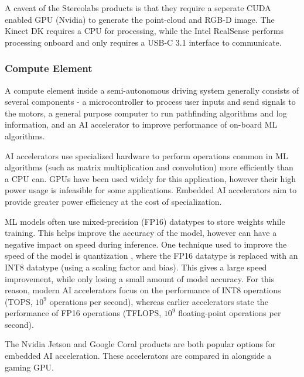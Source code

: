 \documentclass[12pt]{article}
\begin{document}
A caveat of the Stereolabs products is that they require a seperate CUDA enabled GPU (Nvidia) to generate the point-cloud
and RGB-D image. The Kinect DK requires a CPU for processing, while the Intel RealSense performs processing onboard
and only requires a USB-C 3.1 interface to communicate.

\subsubsection{Compute Element}
A compute element inside a semi-autonomous driving system generally consists of several components -
a microcontroller to process user inputs and
send signals to the motors, a general purpose computer to run pathfinding algorithms and log information,
and an AI accelerator to improve performance of on-board ML algorithms.

AI accelerators use specialized hardware to perform operations common in ML algorithms (such as matrix multiplication
and convolution) more efficiently than a CPU can. GPUs have been used widely for this application, however their high
power usage is infeasible for some applications. Embedded AI accelerators aim to provide greater power efficiency
at the cost of specialization.

ML models often use mixed-precision (FP16) datatypes to store weights while training. This helps improve the accuracy
of the model, however can have a negative impact on speed during inference. One technique used to improve the speed
of the model is quantization \cite{jacobQuantizationTrainingNeural2017}, where the FP16 datatype is replaced with an
INT8 datatype (using a scaling factor and bias). This gives a large speed improvement, while only losing a small amount
of model accuracy.
For this reason, modern AI accelerators focus on the performance of INT8 operations (TOPS, $10^9$ operations per second),
whereas earlier accelerators state the performance of FP16 operations (TFLOPS, $10^9$ floating-point
operations per second).

The Nvidia Jetson and Google Coral products are both popular options for embedded AI acceleration. These accelerators are compared
in  alongside a gaming GPU. 
\end{document}
